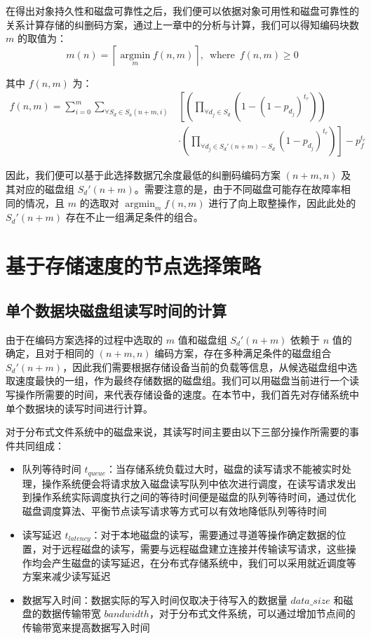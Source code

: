 在得出对象持久性和磁盘可靠性之后，我们便可以依据对象可用性和磁盘可靠性的关系计算存储的纠删码方案，通过上一章中的分析与计算，我们可以得知编码块数 $m$ 的取值为：
$$
m(n)=\left\lceil\operatorname*{argmin}_{m}f(n,m)\right\rceil,\ \operatorname*{where}\ f(n,m) \geq 0
$$

其中 $f(n,m)$ 为：
\begin{align*}
f(n,m)=\sum_{i=0}^{m}\sum_{{\forall}S_{d}{\in}S_{a}(n+m,i)}&\left[\left(\prod_{{\forall}d_{j}{\in}S_{d}}\left(1-(1-p_{d_j})^{t_r}\right)\right)\right.\\
&\cdot\left.\left(\prod_{{\forall}d_{j}{\in}S_{d}'(n+m)-S_{d}}(1-p_{d_j})^{t_{r}}\right)\right]-p_{f}^{t_{r}}
\end{align*}

因此，我们便可以基于此选择数据冗余度最低的纠删码编码方案 $(n+m,n)$ 及其对应的磁盘组 $S_{d}'(n+m)$。需要注意的是，由于不同磁盘可能存在故障率相同的情况，且 $m$ 的选取对 $\displaystyle\operatorname*{argmin}_{m}f(n,m)$ 进行了向上取整操作，因此此处的 $S_{d}'(n+m)$ 存在不止一组满足条件的组合。
\section{基于存储速度的节点选择策略}
\subsection{单个数据块磁盘组读写时间的计算}
由于在编码方案选择的过程中选取的 $m$ 值和磁盘组 $S_{d}'(n+m)$ 依赖于 $n$ 值的确定，且对于相同的 $(n+m,n)$ 编码方案，存在多种满足条件的磁盘组合 $S_{d}'(n+m)$，因此我们需要根据存储设备当前的负载等信息，从候选磁盘组中选取速度最快的一组，作为最终存储数据的磁盘组。我们可以用磁盘当前进行一个读写操作所需要的时间，来代表存储设备的速度。在本节中，我们首先对存储系统中单个数据块的读写时间进行计算。

对于分布式文件系统中的磁盘来说，其读写时间主要由以下三部分操作所需要的事件共同组成：
\begin{itemize}
\item 队列等待时间 $t_{queue}$：当存储系统负载过大时，磁盘的读写请求不能被实时处理，操作系统便会将请求放入磁盘读写队列中依次进行调度，在读写请求发出到操作系统实际调度执行之间的等待时间便是磁盘的队列等待时间，通过优化磁盘调度算法、平衡节点读写请求等方式可以有效地降低队列等待时间
\item 读写延迟 $t_{latency}$：对于本地磁盘的读写，需要通过寻道等操作确定数据的位置，对于远程磁盘的读写，需要与远程磁盘建立连接并传输读写请求，这些操作均会产生磁盘的读写延迟，在分布式存储系统中，我们可以采用就近调度等方案来减少读写延迟
\item 数据写入时间：数据实际的写入时间仅取决于待写入的数据量 $data\_size$ 和磁盘的数据传输带宽 $bandwidth$，对于分布式文件系统，可以通过增加节点间的传输带宽来提高数据写入时间
\end{itemize}

